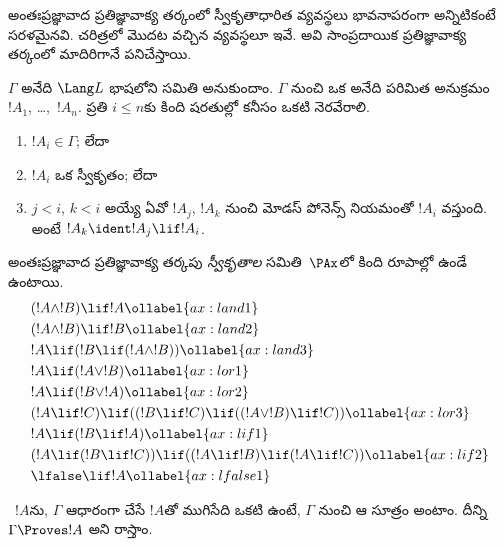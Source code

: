 \documentclass[../../../include/open-logic-section]{subfiles}
\begin{document}


అంతఃప్రజ్ఞావాద ప్రతిజ్ఞావాక్య తర్కంలో స్వీకృతాధారిత
 వ్యవస్థలు భావనాపరంగా
అన్నిటికంటే సరళమైనవి. చరిత్రలో మొదట వచ్చిన
 వ్యవస్థలూ ఇవే.
అవి సాంప్రదాయిక ప్రతిజ్ఞావాక్య తర్కంలో మాదిరిగానే పనిచేస్తాయి.

\begin{defn}
$\Gamma$ అనేది $\Lang L$ భాషలోని
 సమితి అనుకుందాం.
$\Gamma$ నుంచి ఒక \emph{}
అనేది  పరిమిత అనుక్రమం
$!A_1$, \dots,~$!A_n$. ప్రతి $i \le n$కు కింది షరతుల్లో
కనీసం ఒకటి నెరవేరాలి.
\begin{enumerate}
\item $!A_i \in \Gamma$; లేదా
\item $!A_i$ ఒక స్వీకృతం; లేదా
\item $j < i$, $k <
  i$ అయ్యే ఏవో $!A_j$, $!A_k$ నుంచి మోడస్
  పోనెన్స్ నియమంతో $!A_i$ వస్తుంది. అంటే
  $!A_k \ident !A_j \lif !A_i$.
\end{enumerate}
\end{defn}

\begin{defn}[స్వీకృతాలు]
అంతఃప్రజ్ఞావాద ప్రతిజ్ఞావాక్య తర్కపు
\emph{స్వీకృతాల} సమితి~$\PAx$లో కింది రూపాల్లో ఉండే
 ఉంటాయి.
\begin{align}
  & (!A \land !B) \lif !A \ollabel{ax:land1}\\
  & (!A \land !B) \lif !B \ollabel{ax:land2}\\
  & !A \lif (!B \lif (!A \land !B)) \ollabel{ax:land3}\\
  & !A \lif (!A \lor !B) \ollabel{ax:lor1}\\
  & !A \lif (!B \lor !A) \ollabel{ax:lor2}\\
  & (!A \lif !C) \lif ((!B \lif !C) \lif ((!A \lor !B) \lif !C)) \ollabel{ax:lor3}\\
  & !A \lif (!B \lif !A) \ollabel{ax:lif1}\\
  & (!A \lif (!B \lif !C)) \lif ((!A \lif !B) \lif (!A \lif !C)) \ollabel{ax:lif2}\\
  & \lfalse \lif !A \ollabel{ax:lfalse1}
\end{align}
\end{defn}

\begin{defn}
~$!A$ను,
$\Gamma$ ఆధారంగా చేసే 
$!A$తో ముగిసేది ఒకటి ఉంటే, $\Gamma$ నుంచి ఆ సూత్రం
\emph{} అంటాం. దీన్ని $\Gamma \Proves !A$ అని రాస్తాం.
\end{defn}
\end{document}
